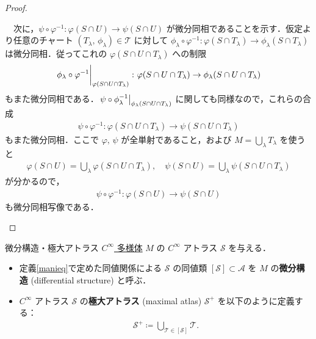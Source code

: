 \documentclass[geometry_main]{subfiles}
\begin{document}
\begin{proof}
\begin{enumerate}
		　次に，$\psi \circ \varphi^{-1} \colon \varphi (S \cap U) \to \psi (S \cap U)$ が微分同相であることを示す．仮定より任意のチャート $(T_\lambda,\, \phi_\lambda) \in \mathcal{T}$ に対して
		$\phi_\lambda \circ \varphi^{-1} \colon \varphi (S \cap T_\lambda) \to \phi_\lambda (S \cap T_\lambda)$ は微分同相．従ってこれの $\varphi(S \cap U \cap T_\lambda)$ への制限
		\begin{align}
			\eval{\phi_\lambda \circ \varphi^{-1}}_{\varphi(S \cap U \cap T_\lambda)} \colon  \varphi (S \cap U \cap T_\lambda) \to \phi_\lambda (S \cap U \cap T_\lambda)
		\end{align}
		もまた微分同相である．$\eval{\psi \circ \phi^{-1}_\lambda}_{\phi_\lambda(S \cap U \cap T_\lambda)}$ に関しても同様なので，これらの合成
		\begin{align}
			\psi \circ \varphi^{-1} \colon \varphi (S \cap U \cap T_\lambda) \to \psi (S \cap U \cap T_\lambda)
		\end{align}
		もまた微分同相．ここで $\varphi,\, \psi$ が全単射であること，および $M = \bigcup_{\lambda} T_\lambda$ を使うと
		\begin{align}
			\varphi(S \cap U) = \bigcup_\lambda \varphi(S \cap U \cap T_\lambda),\quad \psi(S \cap U) = \bigcup_\lambda \psi(S \cap U \cap T_\lambda)
		\end{align}
		が分かるので，
		\begin{align}
			\psi \circ \varphi^{-1} \colon \varphi(S \cap U) \to \psi(S \cap U)
		\end{align}
		も微分同相写像である．
	\end{enumerate}
\end{proof}

\begin{mydef}[label=maxatlas]{微分構造・極大アトラス}
	\hyperref[diffmani]{$C^\infty$ 多様体} $M$ の $C^\infty$ アトラス $\mathcal{S}$ を与える．
	\begin{itemize}
		\item 定義\ref{manieq}で定めた同値関係による $\mathcal{S}$ の同値類 $[\mathcal{S}] \subset \mathscr{A}$ を $M$ の\textbf{微分構造} (differential structure) と呼ぶ．
		\item $C^\infty$ アトラス $\mathcal{S}$ の\textbf{極大アトラス} (maximal atlas) $\mathcal{S}^+$ を以下のように定義する：
		\begin{align}
			\mathcal{S}^+ \coloneqq \bigcup_{\mathcal{T} \in [\mathcal{S}]} \mathcal{T}.
		\end{align}
	\end{itemize}
\end{mydef}
\end{document}
